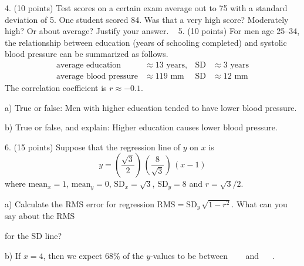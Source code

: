 \documentclass[10pt]{article}
\begin{document}
4. (10 points) Test scores on a certain exam average out to 75 with a standard 
deviation of 5.  One student scored 84.   Was that a very high score?  Moderately high?  
Or about average?  Justify your answer.
\vfill
\eject
{\ }
5. (10 points) 
For men age 25--34, the relationship between education (years of schooling
completed) and systolic blood pressure can be summarized as follows.
\begin{align*}
\mbox{average education} &\approx 13 \mbox{ years},
  & \mbox{SD} &\approx 3 \mbox{ years}\\
\mbox{average blood pressure} &\approx 119 \mbox{ mm}
  & \mbox{SD} &\approx 12 \mbox{ mm}
\end{align*}
The correlation coefficient is $r\approx -0.1$.

\hspace{20pt} a) True or false:  Men with higher education tended to have lower blood pressure.
\bigskip

\hspace{20pt} b) True or false, and explain:  Higher education causes lower blood pressure.
\vspace{2in}


6. (15 points) Suppose that the regression line of $y$ on $x$ 
is \[y=\left(\frac{\sqrt{3}}{2}\right)\,\left(\frac{8}{\sqrt{3}}\right)\,(x-1)\] 
where $\mbox{mean}_x=1$, $\mbox{mean}_y=0$, $\mbox{SD}_x=\sqrt{3}$, $\mbox{SD}_y=8$
and $r=\sqrt{3}/2$.\vspace{3pt}

\hspace{20pt} a) Calculate the RMS error for regression 
$\mbox{RMS}=\mbox{SD}_y\,\sqrt{1-r^2}$.  What can you say about the RMS\vspace{-4pt}

\hspace{20pt}\hphantom{b) } for the SD line?
\vspace{2in}

\hspace{20pt} b) If $x=4$, then we expect 68\% of the $y$-values to be
between \ \underline{\hspace{60pt}} \ \ and \  \underline{\hspace{60pt}} \ .
\vspace{2in}



\vfill
\eject
\end{document}
